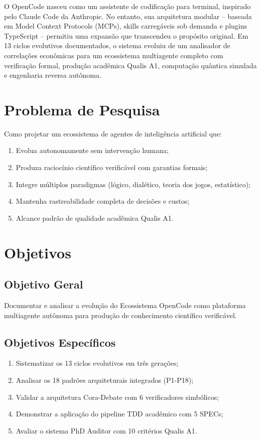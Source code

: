 \documentclass[12pt,a4paper,sumario=tradicional]{abntex2}
\begin{document}
O OpenCode nasceu como um assistente de codificação para terminal, inspirado pelo Claude Code da Anthropic. No entanto, sua arquitetura modular -- baseada em Model Context Protocols (MCPs), skills carregáveis sob demanda e plugins TypeScript -- permitiu uma expansão que transcendeu o propósito original. Em 13 ciclos evolutivos documentados, o sistema evoluiu de um analisador de correlações econômicas para um ecossistema multiagente completo com verificação formal, produção acadêmica Qualis A1, computação quântica simulada e engenharia reversa autônoma.

\section{Problema de Pesquisa}

Como projetar um ecossistema de agentes de inteligência artificial que:
\begin{enumerate}
    \item Evolua autonomamente sem intervenção humana;
    \item Produza raciocínio científico verificável com garantias formais;
    \item Integre múltiplos paradigmas (lógico, dialético, teoria dos jogos, estatístico);
    \item Mantenha rastreabilidade completa de decisões e custos;
    \item Alcance padrão de qualidade acadêmica Qualis A1.
\end{enumerate}

\section{Objetivos}

\subsection{Objetivo Geral}

Documentar e analisar a evolução do Ecossistema OpenCode como plataforma multiagente autônoma para produção de conhecimento científico verificável.

\subsection{Objetivos Específicos}

\begin{enumerate}
    \item Sistematizar os 13 ciclos evolutivos em três gerações;
    \item Analisar os 18 padrões arquiteturais integrados (P1-P18);
    \item Validar a arquitetura Cora-Debate com 6 verificadores simbólicos;
    \item Demonstrar a aplicação do pipeline TDD acadêmico com 5 SPECs;
    \item Avaliar o sistema PhD Auditor com 10 critérios Qualis A1.
\end{enumerate}
\end{document}
